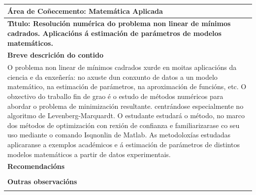 \documentclass[11pt,a4paper]{book}
\theoremstyle{definition}
\theoremstyle{remark}
\begin{document}
\begingroup
\renewcommand*{\arraystretch}{2.2}
\begin{tabular}{|l|}
	\hline
	
	{\bf \'Area de Co\~necemento:  \/ Matemática Aplicada}\\ \hline
	\begin{minipage}{11.5cm}
		{\vspace*{.2cm}
			\bf T\'{\i}tulo:   \/ \bf Resolución numérica do problema non linear de mínimos cadrados. Aplicacións á estimación de parámetros de modelos matemáticos.
			\vspace{.2cm}}
	\end{minipage}\\ \hline
	\bf Breve descrici\'on do contido\\ \hline
	\begin{minipage}{11.5cm}
		{\vspace*{.2cm}
O problema non linear de mínimos cadrados xurde en moitas aplicacións da ciencia e da enxeñería:
no axuste dun conxunto de datos a un modelo matemático, na estimación de parámetros,
na aproximación de funcións, etc. O obxectivo do traballo fin de grao é o estudo de métodos
numéricos para abordar o problema de minimización resultante. centrándose especialmente no
algoritmo de Levenberg-Marquardt. O estudante estudará o método, no marco dos métodos de
optimización con rexión de confianza e familiarizarase co seu uso mediante o comando
Isqnonlin de Matlab. As metodoloxías estudadas aplicaranse a exemplos académicos e á
estimación de parámetros de distintos modelos matemáticos a partir de datos experimentais.
		\vspace{.2cm}}
	\end{minipage}\\ \hline
	{\bf Recomendaci\'ons}\\ \hline
	\begin{minipage}{11.5cm}
		{\vspace*{.2cm}


		\vspace{.2cm}}
	\end{minipage}\\ \hline
	{\bf Outras observaci\'ons}\\ \hline
	\begin{minipage}{11.5cm}
		{\vspace*{.2cm}


			\vspace{.2cm}}
	\end{minipage}\\ \hline
\end{tabular}
\endgroup
\end{document}
